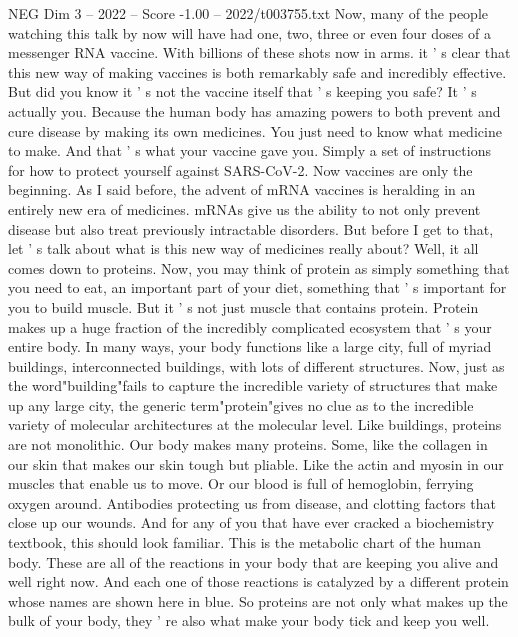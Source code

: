 \begin{textsample}{NEG Dim 3 – 2022 – Score -1.00 – 2022/t003755.txt}  \label{ex:f3_neg_063}
Now, many of the people watching this talk by now will have had one, two, three or even four doses of a messenger RNA vaccine.
With billions of these shots now in arms. it ' s clear that this new way of making vaccines is both remarkably safe and incredibly effective.
But did you know it ' s not the vaccine itself that ' s keeping you safe?
It ' s actually you.
Because the human body has amazing powers to both prevent and cure disease by making its own medicines.
You just need to know what medicine to make.
And that ' s what your vaccine gave you.
Simply a set of instructions for how to protect yourself against SARS-CoV-2.
Now vaccines are only the beginning.
As I said before, the advent of mRNA vaccines is heralding in an entirely new era of medicines. mRNAs give us the ability to not only prevent disease but also treat previously intractable disorders.
But before I get to that, let ' s talk about what is this new way of medicines really about?
Well, it all comes down to proteins.
Now, you may think of protein as simply something that you need to eat, an important part of your diet, something that ' s important for you to build muscle.
But it ' s not just muscle that contains protein.
Protein makes up a huge fraction of the incredibly complicated ecosystem that ' s your entire body.
In many ways, your body functions like a large city, full of myriad buildings, interconnected buildings, with lots of different structures.
Now, just as the word"building"fails to capture the incredible variety of structures that make up any large city, the generic term"protein"gives no clue as to the incredible variety of molecular architectures at the molecular level.
Like buildings, proteins are not monolithic.
Our body makes many proteins.
Some, like the collagen in our skin that makes our skin tough but pliable.
Like the actin and myosin in our muscles that enable us to move.
Or our blood is full of hemoglobin, ferrying oxygen around.
Antibodies protecting us from disease, and clotting factors that close up our wounds.
And for any of you that have ever cracked a biochemistry textbook, this should look familiar.
This is the metabolic chart of the human body.
These are all of the reactions in your body that are keeping you alive and well right now.
And each one of those reactions is catalyzed by a different protein whose names are shown here in blue.
So proteins are not only what makes up the bulk of your body, they ' re also what make your body tick and keep you well.

\end{textsample}
